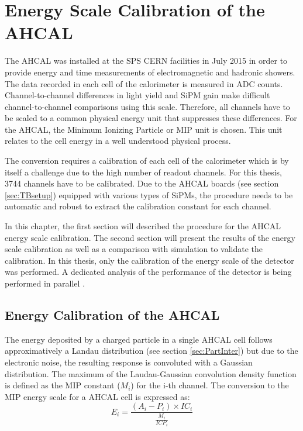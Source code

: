 \chapter{Energy Scale Calibration of the AHCAL}
\label{chap:ECalibAHCAL}

The AHCAL was installed at the SPS CERN facilities in July 2015 in order to provide energy and time measurements of electromagnetic and hadronic showers. The data recorded in each cell of the calorimeter is measured in ADC counts. Channel-to-channel differences in light yield and SiPM gain make difficult channel-to-channel comparisons using this scale. Therefore, all channels have to be scaled to a common physical energy unit that suppresses these differences. For the AHCAL, the Minimum Ionizing Particle or MIP unit is chosen. This unit relates to the cell energy in a well understood physical process.

The conversion requires a calibration of each cell of the calorimeter which is by itself a challenge due to the high number of readout channels. For this thesis, 3744 channels have to be calibrated. Due to the AHCAL boards (see section \ref{sec:TBsetup}) equipped with various types of SiPMs, the procedure needs to be automatic and robust to extract the calibration constant for each channel.

In this chapter, the first section will described the procedure for the AHCAL energy scale calibration. The second section will present the results of the energy scale calibration as well as a comparison with simulation to validate the calibration. In this thesis, only the calibration of the energy scale of the detector was performed. A dedicated analysis of the performance of the detector is being performed in parallel \cite{AmbraEnergy, AmbraTokyo}.

\section{Energy Calibration of the AHCAL}
\label{sec:EnergyCalibration}

The energy deposited by a charged particle in a single AHCAL cell follows approximatively a Landau distribution (see section \ref{sec:PartInter}) but due to the electronic noise, the resulting response is convoluted with a Gaussian distribution. The maximum of the Laudau-Gaussian convolution density function is defined as the MIP constant ($M_{i}$) for the i-th channel. The conversion to the MIP energy scale for a AHCAL cell is expressed as:
\begin{equation}
	E_i = \frac{(A_i - P_i) \times IC_i }{\frac{M_{i}}{ICP_i}}
\end{equation}

